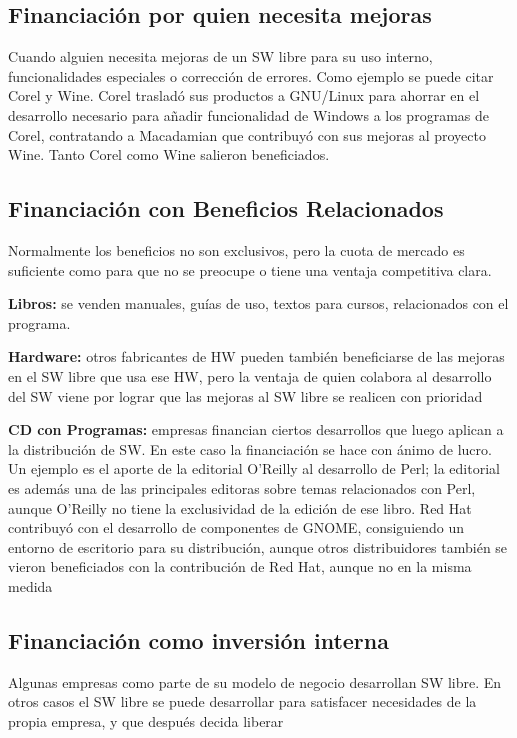 \subsection{Financiación por quien necesita mejoras}

Cuando alguien necesita mejoras de un SW libre para su uso interno, funcionalidades especiales o corrección de errores.
Como ejemplo se puede citar Corel y Wine. Corel trasladó sus productos a GNU/Linux para ahorrar en el desarrollo necesario para añadir funcionalidad de Windows a los programas de Corel, contratando a Macadamian que contribuyó con sus mejoras al proyecto Wine. Tanto Corel como Wine salieron beneficiados.

\subsection{Financiación con Beneficios Relacionados}

Normalmente los beneficios no son exclusivos, pero la cuota de mercado es suficiente como para que no se preocupe o tiene una ventaja competitiva clara.

{\bf Libros: } se venden manuales, guías de uso, textos para cursos, relacionados con el programa.

{\bf Hardware: } otros fabricantes de HW pueden también beneficiarse de las mejoras en el SW libre que usa ese HW, pero la ventaja de quien colabora al desarrollo del SW viene por lograr que las mejoras al SW libre se realicen con prioridad

{\bf CD con Programas: } empresas financian ciertos desarrollos que luego aplican a la distribución de SW. En este caso la financiación se hace con ánimo de lucro.
Un ejemplo es el aporte de la editorial O’Reilly al desarrollo de Perl; la editorial es además una de las principales editoras sobre temas relacionados con Perl, aunque O’Reilly no tiene la exclusividad de la edición de ese libro. Red Hat contribuyó con el desarrollo de componentes de GNOME, consiguiendo un entorno de escritorio para su distribución, aunque otros distribuidores también se vieron beneficiados con la contribución de Red Hat, aunque no en la misma medida

\subsection{Financiación como inversión interna}

Algunas empresas como parte de su modelo de negocio desarrollan SW libre. En otros casos el SW libre se puede desarrollar para satisfacer necesidades de la propia empresa, y que después decida liberar

